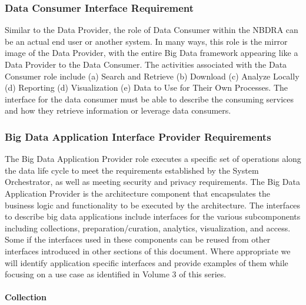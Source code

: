 \documentclass[10pt]{article}
\begin{document}
\subsubsection{Data Consumer Interface Requirement}\label{S:r-consumer}

Similar to the Data Provider, the role of Data Consumer within the
NBDRA can be an actual end user or another system. In many ways, this
role is the mirror image of the Data Provider, with the entire Big
Data framework appearing like a Data Provider to the Data Consumer.
The activities associated with the Data Consumer role include (a)
Search and Retrieve (b) Download (c) Analyze Locally (d) Reporting (d)
Visualization (e) Data to Use for Their Own Processes. The interface
for the data consumer must be able to describe the consuming services
and how they retrieve information or leverage data consumers.

\subsubsection{Big Data Application Interface Provider Requirements}\label{S:r-app}

The Big Data Application Provider role executes a specific set of
operations along the data life cycle to meet the requirements
established by the System Orchestrator, as well as meeting security
and privacy requirements. The Big Data Application Provider is the
architecture component that encapsulates the business logic and
functionality to be executed by the architecture. The interfaces to
describe big data applications include interfaces for the various
subcomponents including collections, preparation/curation, analytics,
visualization, and access. Some if the interfaces used in these
components can be reused from other interfaces introduced in other
sections of this document. Where appropriate we will identify
application specific interfaces and provide examples of them while
focusing on a use case as identified in Volume 3 \cite{nist-vol-3} of
this series.

\paragraph{Collection}
\end{document}
